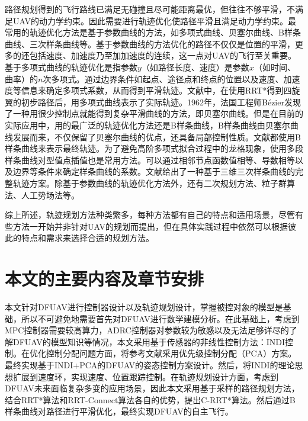 路径规划得到的飞行路线已满足无碰撞且尽可能距离最优，但往往不够平滑，不满足UAV的动力学约束。因此需要进行轨迹优化使路径平滑且满足动力学约束。最常用的轨迹优化方法是基于参数曲线的方法，如多项式曲线、贝塞尔曲线、B样条曲线、三次样条曲线等。基于参数曲线的方法优化的路径不仅仅是位置的平滑，更多的还包括速度、加速度乃至加加速度的连续，这一点对UAV的飞行至关重要。基于多项式曲线的轨迹优化是指参数$y$（如路径长度、速度）是参数$x$（如时间、曲率）的$n$次多项式。通过边界条件如起点、途径点和终点的位置以及速度、加速度等信息来确定多项式系数，从而得到平滑轨迹。文献\cite{arshadQuadrotorPathPlanning2023}中，在使用RRT*得到四旋翼的初步路径后，用多项式曲线表示了实际轨迹。1962年，法国工程师Bézier发现了一种用很少控制点就能得到复杂平滑曲线的方法，即贝塞尔曲线。但是在目前的实际应用中，用的最广泛的轨迹优化方法还是B样条曲线，B样条曲线由贝塞尔曲线发展而来，不仅保留了贝塞尔曲线的优点，还具备局部控制性质。文献\parencite{huangResearchPathPlanning2022,eshtehardianContinuousRRTbasedPath2023,fengSmoothPathPlanning2024a}都使用B样条曲线来表示最终轨迹。为了避免高阶多项式拟合过程中的龙格现象，使用多段样条曲线对型值点插值也是常用方法。可以通过相邻节点函数值相等、导数相等以及边界等条件来确定样条曲线的系数。文献\parencite{coteComplex3DFlighta}给出了一种基于三维三次样条曲线的完整轨迹方案。除基于参数曲线的轨迹优化方法外，还有二次规划方法\cite{arshadQuadrotorPathPlanning2023}、粒子群算法\cite{shinUAVPathPlanning2020}、人工势场法\cite{sunUavPathPlanning2022}等。

综上所述，轨迹规划方法种类繁多，每种方法都有自己的特点和适用场景，尽管有些方法一开始并非针对UAV的规划而提出，但在具体实践过程中依然可以根据彼此的特点和需求来选择合适的规划方法。

\section{本文的主要内容及章节安排}

本文针对DFUAV进行控制器设计以及轨迹规划设计，掌握被控对象的模型是基础，所以不可避免地需要首先对DFUAV进行数学建模分析。在此基础上，考虑到MPC控制器需要较高算力，ADRC控制器对参数较为敏感以及无法足够详尽的了解DFUAV的模型知识等情况，本文采用基于传感器的非线性控制方法：INDI控制。在优化控制分配问题方面，将参考文献\parencite{HKXB202010026}采用优先级控制分配（PCA）方案。最终实现基于INDI+PCA的DFUAV的姿态控制方案设计。然后，将INDI的理论思想扩展到速度环，实现速度、位置跟踪控制。在轨迹规划设计方面，考虑到DFUAV未来面临复杂多变的应用场景，因此本文采用基于采样的路径规划方法，结合RRT*算法和RRT-Connect算法各自的优势，提出C-RRT*算法。然后通过B样条曲线对路径进行平滑优化，最终实现DFUAV的自主飞行。

